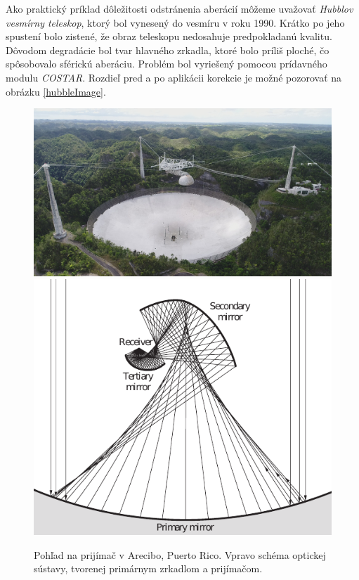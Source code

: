 Ako praktický príklad dôležitosti odstránenia aberácií môžeme uvažovať \textit{Hubblov vesmírny
teleskop},
ktorý bol vynesený do vesmíru v roku 1990. Krátko po jeho spustení bolo zistené, že obraz
teleskopu nedosahuje predpokladanú kvalitu. Dôvodom degradácie bol tvar hlavného zrkadla, ktoré bolo
príliš ploché, čo spôsobovalo sférickú aberáciu. Problém bol vyriešený pomocou prídavného modulu
\textit{COSTAR}\cite{hechtoptics}. Rozdieľ pred a po aplikácii korekcie je možné pozorovať na obrázku
\ref{hubbleImage}. 

\begin{figure}
    \includegraphics[scale=0.12]{obrazky-figures/areciboSite.jpg}
    \includegraphics[scale=0.65]{obrazky-figures/arecibo.pdf}
    \caption{Pohľad na prijímač v Arecibo, Puerto Rico. Vpravo schéma optickej sústavy, tvorenej
    primárnym zrkadlom a prijímačom.}
\end{figure}


